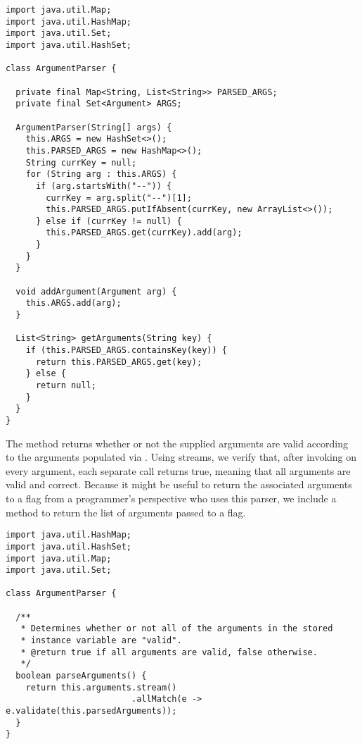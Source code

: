 \begin{lstlisting}[language=MyJava]
import java.util.Map;
import java.util.HashMap;
import java.util.Set;
import java.util.HashSet;

class ArgumentParser {

  private final Map<String, List<String>> PARSED_ARGS;
  private final Set<Argument> ARGS;

  ArgumentParser(String[] args) {
    this.ARGS = new HashSet<>();
    this.PARSED_ARGS = new HashMap<>();
    String currKey = null;
    for (String arg : this.ARGS) {
      if (arg.startsWith("--")) {
        currKey = arg.split("--")[1];
        this.PARSED_ARGS.putIfAbsent(currKey, new ArrayList<>());
      } else if (currKey != null) {
        this.PARSED_ARGS.get(currKey).add(arg);
      }
    }
  }

  void addArgument(Argument arg) { 
    this.ARGS.add(arg); 
  }

  List<String> getArguments(String key) {
    if (this.PARSED_ARGS.containsKey(key)) {
      return this.PARSED_ARGS.get(key);
    } else {
      return null;
    }
  }
}
\end{lstlisting}

The  method returns whether or not the supplied arguments are valid according to the arguments populated via . Using streams, we verify that, after invoking  on every argument, each separate call returns true, meaning that all arguments are valid and correct. Because it might be useful to return the associated arguments to a flag from a programmer's perspective who uses this parser, we include a  method to return the list of arguments passed to a flag.

\enlargethispage{-5\baselineskip}
\begin{lstlisting}[language=MyJava]
import java.util.HashMap;
import java.util.HashSet;
import java.util.Map;
import java.util.Set;

class ArgumentParser {

  /**
   * Determines whether or not all of the arguments in the stored
   * instance variable are "valid".
   * @return true if all arguments are valid, false otherwise.
   */
  boolean parseArguments() {
    return this.arguments.stream()
                         .allMatch(e -> e.validate(this.parsedArguments));
  }
}
\end{lstlisting}

